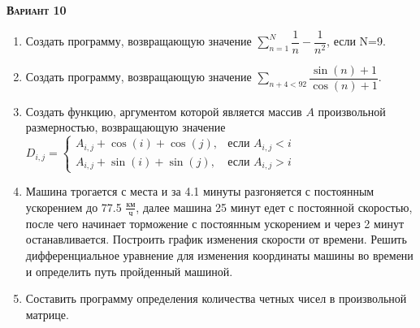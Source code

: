 \textsc{\textbf{Вариант 10}}
\begin{enumerate}
\item  Создать программу, возвращающую значение $\sum\limits_{n=1}^{N} {\dfrac{1}{n} -\dfrac{1}{n^2}}$, если N=9. 
\item  Создать программу, возвращающую значение $\sum\limits_{n+4<      92} \dfrac{\sin(n)+1}{\cos(n)+1}  $. 
\item Создать функцию, аргументом которой является массив $A$ произвольной размерностью, возвращающую значение $D_{i,j}=\begin{cases} A_{i,j}+\cos(i)+\cos(j), & \text{если } {A_{i,j}}<i \\  A_{i,j}+\sin(i)+\sin(j), & \text{если } {A_{i,j}}>i \end{cases}$ 
\item Машина трогается с места и за  4.1 минуты разгоняется с постоянным ускорением до 77.5 ${\frac{км}{ч}}$, далее машина   25 минут едет с постоянной скоростью, после чего начинает торможение с постоянным ускорением и через   2 минут останавливается. Построить график изменения скорости от времени. Решить дифференциальное уравнение для изменения координаты машины во времени и определить путь пройденный машиной.  \item Составить программу определения количества четных чисел в произвольной матрице.                                                                                                                                                                

\end{enumerate}
